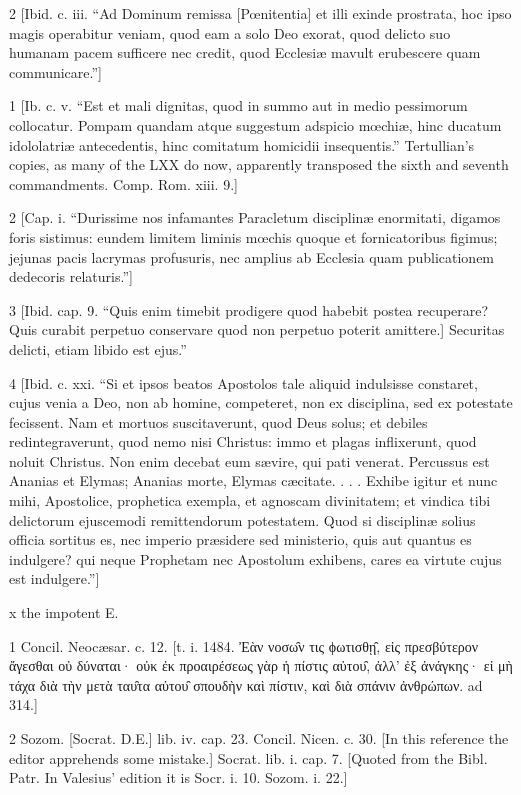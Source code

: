 2
[Ibid. c. iii. “Ad Dominum remissa [Pœnitentia] et illi exinde prostrata, hoc ipso magis operabitur veniam, quod eam a solo Deo exorat, quod delicto suo humanam pacem sufficere nec credit, quod Ecclesiæ mavult erubescere quam communicare.”]

1
[Ib. c. v. “Est et mali dignitas, quod in summo aut in medio pessimorum collocatur. Pompam quandam atque suggestum adspicio mœchiæ, hinc ducatum idololatriæ antecedentis, hinc comitatum homicidii insequentis.” Tertullian’s copies, as many of the LXX do now, apparently transposed the sixth and seventh commandments. Comp. Rom. xiii. 9.]

2
[Cap. i. “Durissime nos infamantes Paracletum disciplinæ enormitati, digamos foris sistimus: eundem limitem liminis mœchis quoque et fornicatoribus figimus; jejunas pacis lacrymas profusuris, nec amplius ab Ecclesia quam publicationem dedecoris relaturis.”]

3
[Ibid. cap. 9. “Quis enim timebit prodigere quod habebit postea recuperare? Quis curabit perpetuo conservare quod non perpetuo poterit amittere.] Securitas delicti, etiam libido est ejus.”

4
[Ibid. c. xxi. “Si et ipsos beatos Apostolos tale aliquid indulsisse constaret, cujus venia a Deo, non ab homine, competeret, non ex disciplina, sed ex potestate fecissent. Nam et mortuos suscitaverunt, quod Deus solus; et debiles redintegraverunt, quod nemo nisi Christus: immo et plagas inflixerunt, quod noluit Christus. Non enim decebat eum sævire, qui pati venerat. Percussus est Ananias et Elymas; Ananias morte, Elymas cæcitate. . . . Exhibe igitur et nunc mihi, Apostolice, prophetica exempla, et agnoscam divinitatem; et vindica tibi delictorum ejuscemodi remittendorum potestatem. Quod si disciplinæ solius officia sortitus es, nec imperio præsidere sed ministerio, quis aut quantus es indulgere? qui neque Prophetam nec Apostolum exhibens, cares ea virtute cujus est indulgere.”]

x
the impotent E.

1
Concil. Neocæsar. c. 12. [t. i. 1484. Ἐὰν νοσω̑ν τις ϕωτισθῃ̑, εἰς πρεσβύτερον ἄγεσθαι οὐ δύναται· οὐκ ἐκ προαιρέσεως γὰρ ἡ πίστις αὐτου̑, ἀλλ’ ἐξ ἀνάγκης· εἰ μὴ τάχα διὰ τὴν μετὰ ταυ̑τα αὐτου̑ σπουδὴν καὶ πίστιν, καὶ διὰ σπάνιν ἀνθρώπων. ad 314.]

2
Sozom. [Socrat. D.E.] lib. iv. cap. 23. Concil. Nicen. c. 30. [In this reference the editor apprehends some mistake.] Socrat. lib. i. cap. 7. [Quoted from the Bibl. Patr. In Valesius’ edition it is Socr. i. 10. Sozom. i. 22.]

